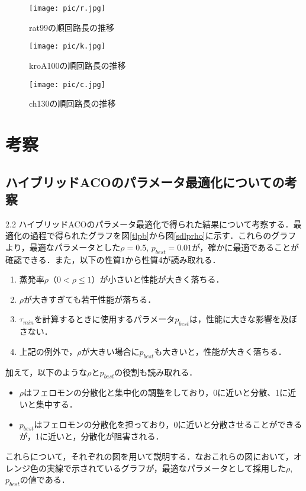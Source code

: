 \documentclass[a4j]{jsarticle}
\begin{document}
\begin{figure}[htbp]
 \begin{minipage}{0.5\hsize}
  \begin{center}
  \texttt{[image: pic/r.jpg]}
  \end{center}
  \caption{rat99の順回路長の推移}
  \label{rat}
 \end{minipage}
 \begin{minipage}{0.5\hsize}
  \begin{center}
  \texttt{[image: pic/k.jpg]}
  \end{center}
  \caption{kroA100の順回路長の推移}
  \label{kro}
 \end{minipage}
\end{figure}
\begin{figure}[htb]
 \begin{center}
  \texttt{[image: pic/c.jpg]}
 \end{center}
  \caption{ch130の順回路長の推移}
  \label{ch}
\end{figure}




\section{考察}
\subsection{ハイブリッドACOのパラメータ最適化についての考察}
2.2 ハイブリッドACOのパラメータ最適化で得られた結果について考察する．最適化の過程で得られたグラフを図\ref{tlpb}から図\ref{sdlprho}に示す．これらのグラフより，最適なパラメータとした$\rho = 0.5$, $p_{best} = 0.01$が，確かに最適であることが確認できる．また，以下の性質1から性質4が読み取れる．
\begin{enumerate}
 \item 蒸発率$\rho$（$0<\rho\leq1$）が小さいと性能が大きく落ちる．
 \item $\rho$が大きすぎても若干性能が落ちる．
 \item $\tau_{min}$を計算するときに使用するパラメータ$p_{best}$は，性能に大きな影響を及ぼさない．
 \item 上記の例外で，$\rho$が大きい場合に$p_{best}$も大きいと，性能が大きく落ちる．
\end{enumerate}
加えて，以下のような$\rho$と$p_{best}$の役割も読み取れる．
\begin{itemize}
 \item $\rho$はフェロモンの分散化と集中化の調整をしており，0に近いと分散、1に近いと集中する．
 \item $p_{best}$はフェロモンの分散化を担っており，0に近いと分散させることができるが，1に近いと，分散化が阻害される．
\end{itemize}
これらについて，それぞれの図を用いて説明する．なおこれらの図において，オレンジ色の実線で示されているグラフが，最適なパラメータとして採用した$\rho$, $p_{best}$の値である．
\end{document}
